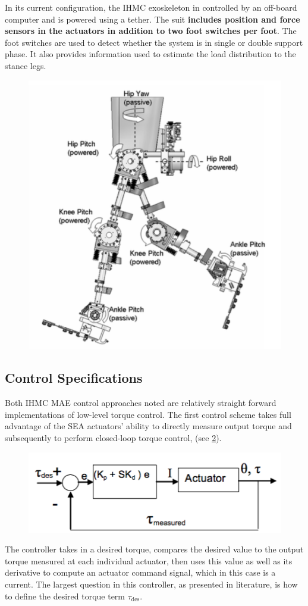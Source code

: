  In its current configuration, the IHMC exoskeleton in controlled by an off-board computer and is powered using a tether. The suit {\bf includes position and force sensors in the actuators in addition to two foot switches per foot}.  The foot switches are used to detect whether the system is in single or double support phase.  It also provides information used to estimate the load distribution to the stance legs.
 
 
 \begin{figure}[thpb]
\centering
\includegraphics[width=3.in]{exos/figs/ihmc/ihmcSys}
  \caption{}
  \vspace{-0.2in}
 \label{fig:IHMCSYS}   
 \end{figure}
 
 
 \subsection{Control Specifications}
 
 Both IHMC MAE control approaches noted are relatively straight forward implementations of low-level torque control.  The first control scheme takes full advantage of the SEA actuators' ability to directly measure output torque and subsequently to perform closed-loop torque control, (see \ref{fig:IHMCTOR}). 
  \begin{figure}[thpb]
\centering
\includegraphics[width=3.in]{exos/figs/ihmc/torqueCon}
  \caption{}
  \vspace{-0.2in}
 \label{fig:IHMCTOR}   
 \end{figure}
 The controller takes in a desired torque, compares the desired value to the output torque measured at each individual actuator, then uses this value as well as its derivative to compute an actuator command signal, which in this case is a current.  The largest question in this controller, as presented in literature, is how to define the desired torque term $\tau_\text{des}$.
 
